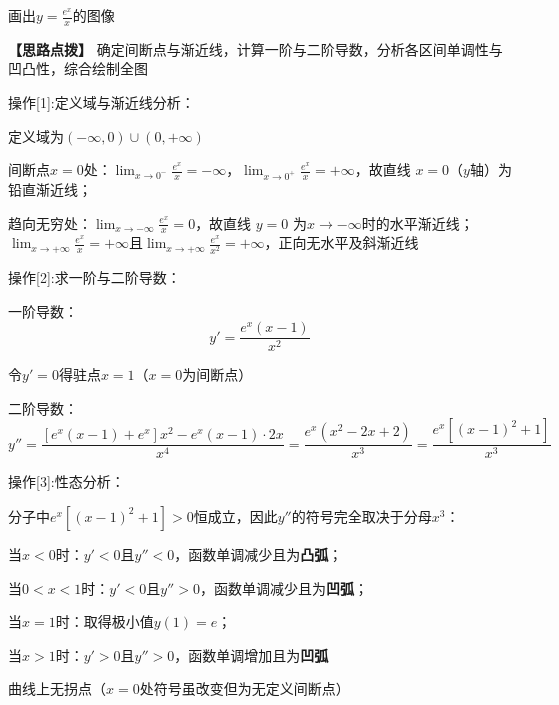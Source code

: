 \documentclass[11pt,a4paper,UTF8]{ctexart}
\begin{document}
画出$y = \frac{e^x}{x}$的图像

\textbf{\color{DeepPurple}【思路点拨】} 确定间断点与渐近线，计算一阶与二阶导数，分析各区间单调性与凹凸性，综合绘制全图


操作[1]:定义域与渐近线分析：

\begin{solbox}[分步推导与答题规范]
定义域为$(-\infty, 0) \cup (0, +\infty)$

间断点$x = 0$处：$\lim_{x \to 0^-} \frac{e^x}{x} = -\infty$，$\lim_{x \to 0^+} \frac{e^x}{x} = +\infty$，故直线 \textit{}$x = 0$\textit{}（$y$轴）为铅直渐近线；

趋向无穷处：$\lim_{x \to -\infty} \frac{e^x}{x} = 0$，故直线 \textit{}$y = 0$\textit{} 为$x \to -\infty$时的水平渐近线；$\lim_{x \to +\infty} \frac{e^x}{x} = +\infty$且$\lim_{x \to +\infty} \frac{e^x}{x^2} = +\infty$，正向无水平及斜渐近线
\end{solbox}

操作[2]:求一阶与二阶导数：

\begin{solbox}[分步推导与答题规范]
一阶导数：
\begin{equation*}
y' = \frac{e^x(x - 1)}{x^2}
\end{equation*}


令$y' = 0$得驻点$x = 1$（$x = 0$为间断点）

二阶导数：
\begin{equation*}
y'' = \frac{[e^x(x - 1) + e^x]x^2 - e^x(x - 1) \cdot 2x}{x^4} = \frac{e^x(x^2 - 2x + 2)}{x^3} = \frac{e^x[(x - 1)^2 + 1]}{x^3}
\end{equation*}


\end{solbox}

操作[3]:性态分析：

\begin{solbox}[分步推导与答题规范]
分子中$e^x[(x - 1)^2 + 1] > 0$恒成立，因此$y''$的符号完全取决于分母$x^3$：

当$x < 0$时：$y' < 0$且$y'' < 0$，函数单调减少且为\textbf{凸弧}；

当$0 < x < 1$时：$y' < 0$且$y'' > 0$，函数单调减少且为\textbf{凹弧}；

当$x = 1$时：取得极小值$y(1) = e$；

当$x > 1$时：$y' > 0$且$y'' > 0$，函数单调增加且为\textbf{凹弧}

曲线上无拐点（$x = 0$处符号虽改变但为无定义间断点）
\end{solbox}
\end{document}
